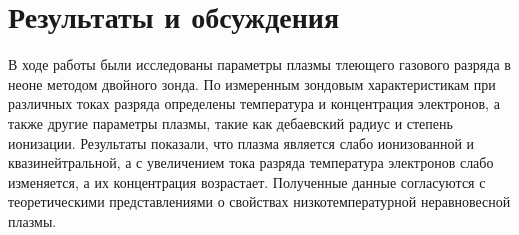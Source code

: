 \documentclass[a4paper]{article}
\begin{document}
\section{Результаты и обсуждения}

В ходе работы были исследованы параметры плазмы тлеющего газового разряда в неоне методом двойного зонда. По измеренным зондовым характеристикам при различных токах разряда определены температура и концентрация электронов, а также другие параметры плазмы, такие как дебаевский радиус и степень ионизации. Результаты показали, что плазма является слабо ионизованной и квазинейтральной, а с увеличением тока разряда температура электронов слабо изменяется, а их концентрация возрастает. Полученные данные согласуются с теоретическими представлениями о свойствах низкотемпературной неравновесной плазмы.
\end{document}

